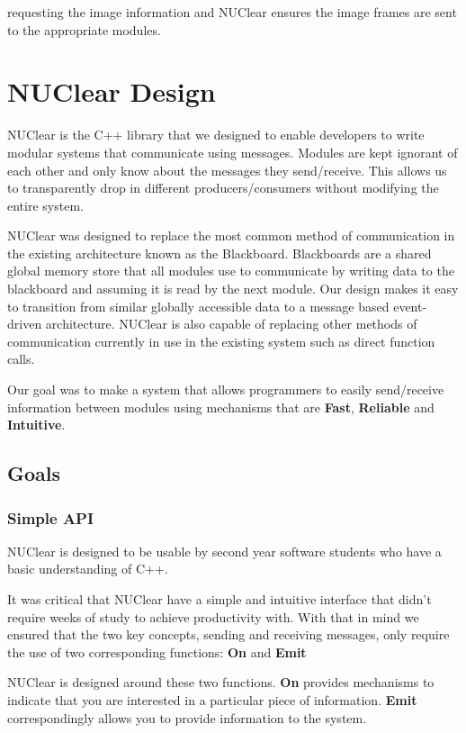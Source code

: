 \documentclass[english,12pt]{scrartcl}
\begin{document}
			requesting the image information and NUClear ensures the image frames are sent to the appropriate modules.
	
	\section{NUClear Design}
		NUClear is the C++ library that we designed to enable developers to write modular systems that communicate using messages. 
		Modules are kept ignorant of each other and only know about the messages they send/receive. 
		This allows us to transparently drop in different producers/consumers without modifying the entire system.
		
		NUClear was designed to replace the most common method of communication in the existing architecture known as the Blackboard.
		Blackboards are a shared global memory store that all modules use to communicate by writing data to the blackboard and assuming it is read by the next module.
		Our design makes it easy to transition from similar globally accessible data to a message based event-driven architecture.
		NUClear is also capable of replacing other methods of communication currently in use in the existing system such as direct function calls.
		
		Our goal was to make a system that allows programmers to easily send/receive information between modules using mechanisms that are \textbf{Fast}, \textbf{Reliable} and \textbf{Intuitive}.

		\subsection{Goals}
			\subsubsection{Simple API}
					NUClear is designed to be usable by second year software students who have a basic understanding of C++. 
					
					It was critical that NUClear have a simple and intuitive interface that didn't require weeks of study to achieve productivity with.
					With that in mind we ensured that the two key concepts, sending and receiving messages, only require the use of two corresponding functions: \textbf{On} and \textbf{Emit}
					
					NUClear is designed around these two functions. \textbf{On} provides mechanisms to indicate that you are interested in a particular piece of information.
					\textbf{Emit} correspondingly allows you to provide information to the system.
					
\end{document}
